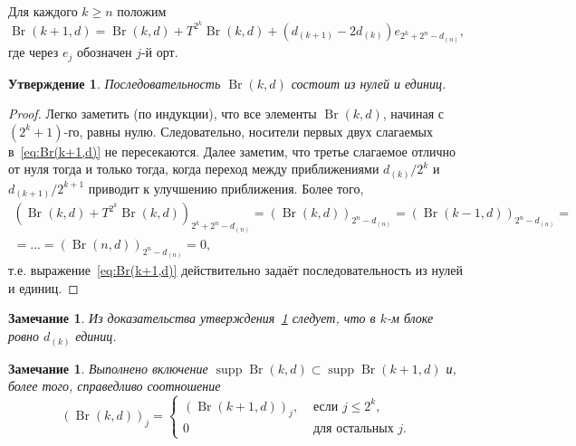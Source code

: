 \documentclass[a4paper,14pt]{article} %
\theoremstyle{plain}
\newtheorem{remark}[lemma]{Замечание}
\newtheorem{proposition}[lemma]{Утверждение}
\begin{document}
Для каждого $k \geq n$ положим
\begin{equation}
	\label{eq:Br(k+1,d)}
	\operatorname{Br}(k+1,d) = \operatorname{Br}(k,d) + T^{2^k}\operatorname{Br}(k,d) + (d_{(k+1)}-2d_{(k)})e_{2^k+2^n-d_{(n)}}
	,
\end{equation}
где через $e_j$ обозначен $j$-й орт.


\begin{proposition}
	\label{prop:Br_k_c_0_1}
	Последовательность $\operatorname{Br}(k,d)$ состоит из нулей и единиц.
\end{proposition}
\begin{proof}
	Легко заметить (по индукции), что все элементы $\operatorname{Br}(k,d)$, начиная с $(2^k+1)$-го, равны нулю.
	Следовательно, носители первых двух слагаемых в~\eqref{eq:Br(k+1,d)} не пересекаются.
	Далее заметим, что третье слагаемое отлично от нуля тогда и только тогда,
	когда переход между приближениями $d_{(k)} / 2^k$ и $d_{(k+1)}/2^{k+1}$
	приводит к улучшению приближения.
	Более того,
	\begin{multline}
		\left(\operatorname{Br}(k,d) + T^{2^k}\operatorname{Br}(k,d)\right)_{2^k+2^n-d_{(n)}}
		=
		(\operatorname{Br}(k,d))_{2^n-d_{(n)}}
		=
		(\operatorname{Br}(k-1,d))_{2^n-d_{(n)}}
		=
		\\=
		...
		=
		(\operatorname{Br}(n,d))_{2^n-d_{(n)}}
		=
		0
		,
	\end{multline}
	т.е. выражение~\eqref{eq:Br(k+1,d)} действительно задаёт последовательность из нулей и единиц.
\end{proof}

\begin{remark}
	Из доказательства утверждения~\ref{prop:Br_k_c_0_1} следует, что в $k$-м блоке ровно $d_{(k)}$ единиц.
\end{remark}


\begin{remark}
	Выполнено включение $\operatorname{supp}\operatorname{Br}(k,d) \subset \operatorname{supp}\operatorname{Br}(k+1,d)$
	и, более того, справедливо соотношение
	\begin{equation}
		(\operatorname{Br}(k,d))_j = \begin{cases}
			(\operatorname{Br}(k+1,d))_j, & \mbox{~если~}  j \leq 2^k,
			\\
			0  & \mbox{~для остальных~} j
			.
		\end{cases}
	\end{equation}
\end{remark}
\end{document}
